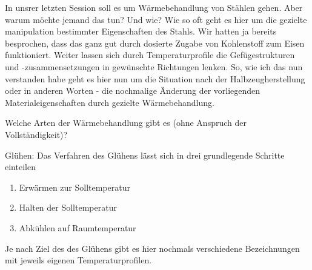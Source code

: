In unsrer letzten Session soll es um Wärmebehandlung von Stählen gehen. Aber warum möchte jemand das tun? Und wie?
Wie so oft geht es hier um die gezielte manipulation bestimmter Eigenschaften des Stahls. Wir hatten ja bereits besprochen,
dass das ganz gut durch dosierte Zugabe von Kohlenstoff zum Eisen funktioniert. Weiter lassen sich durch Temperaturprofile
die Gefügestrukturen und -zusammensetzungen in gewünschte Richtungen lenken. So, wie ich das nun verstanden habe geht es
hier nun um die Situation nach der Halbzeugherstellung oder in anderen Worten - die nochmalige Änderung der vorliegenden
Materialeigenschaften durch gezielte Wärmebehandlung.

Welche Arten der Wärmebehandlung gibt es (ohne Anspruch der Vollständigkeit)?

Glühen:
Das Verfahren des Glühens lässt sich in drei grundlegende Schritte einteilen
\begin{enumerate}
    \item Erwärmen zur Solltemperatur
    \item Halten der Solltemperatur
    \item Abkühlen auf Raumtemperatur
\end{enumerate}
Je nach Ziel des des Glühens gibt es hier nochmals verschiedene Bezeichnungen mit jeweils eigenen Temperaturprofilen.

